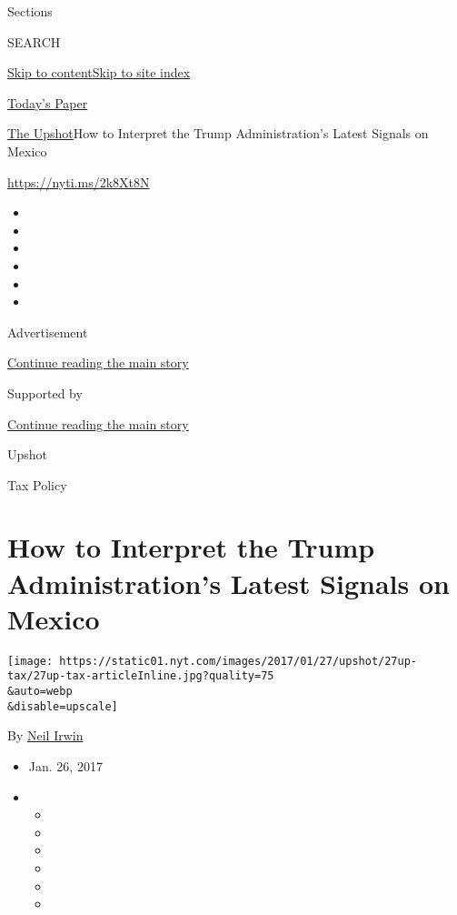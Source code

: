 Sections

SEARCH

\protect\hyperlink{site-content}{Skip to
content}\protect\hyperlink{site-index}{Skip to site index}

\href{https://myaccount.nytimes.com/auth/login?response_type=cookie\&client_id=vi}{}

\href{https://www.nytimes.com/section/todayspaper}{Today's Paper}

\href{/section/upshot}{The Upshot}\textbar{}How to Interpret the Trump
Administration's Latest Signals on Mexico

\url{https://nyti.ms/2k8Xt8N}

\begin{itemize}
\item
\item
\item
\item
\item
\item
\end{itemize}

Advertisement

\protect\hyperlink{after-top}{Continue reading the main story}

Supported by

\protect\hyperlink{after-sponsor}{Continue reading the main story}

Upshot

Tax Policy

\hypertarget{how-to-interpret-the-trump-administrations-latest-signals-on-mexico}{%
\section{How to Interpret the Trump Administration's Latest Signals on
Mexico}\label{how-to-interpret-the-trump-administrations-latest-signals-on-mexico}}

\texttt{[image: https://static01.nyt.com/images/2017/01/27/upshot/27up-tax/27up-tax-articleInline.jpg?quality=75\\\&auto=webp\\\&disable=upscale]}

By \href{http://www.nytimes.com/by/neil-irwin}{Neil Irwin}

\begin{itemize}
\item
  Jan. 26, 2017
\item
  \begin{itemize}
  \item
  \item
  \item
  \item
  \item
  \item
  \end{itemize}
\end{itemize}

